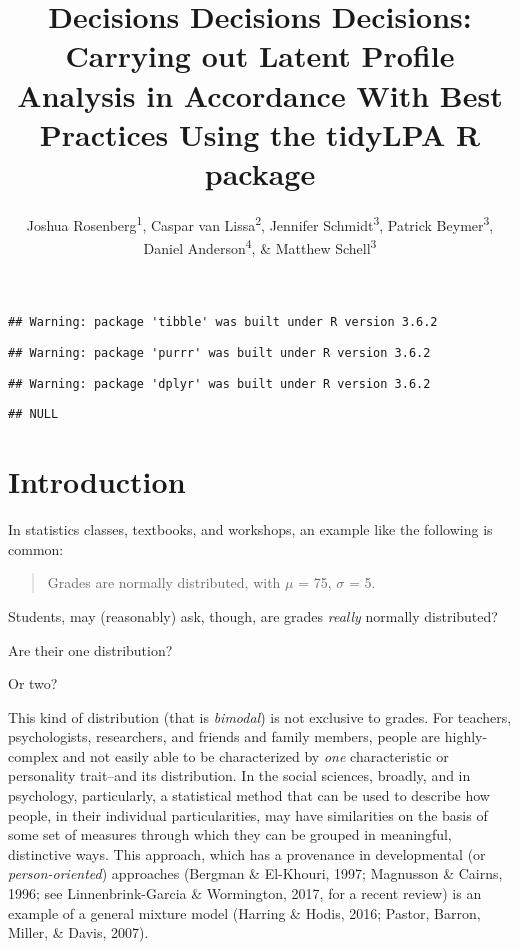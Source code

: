 \documentclass[man]{apa6}
\affiliation{
\vspace{0.5cm}
\textsuperscript{1} University of Tennessee, Knoxville\\\textsuperscript{2} Utrecht University\\\textsuperscript{3} Michigan State University\\\textsuperscript{4} University of Oregon\\\textsuperscript{5} }
\title{Decisions Decisions Decisions: Carrying out Latent Profile Analysis in Accordance With Best Practices Using the tidyLPA R package}
\author{Joshua Rosenberg\textsuperscript{1}, Caspar van Lissa\textsuperscript{2}, Jennifer Schmidt\textsuperscript{3}, Patrick Beymer\textsuperscript{3}, Daniel Anderson\textsuperscript{4}, \& Matthew Schell\textsuperscript{3}}
\date{}
\begin{document}
\maketitle

\begin{verbatim}
## Warning: package 'tibble' was built under R version 3.6.2
\end{verbatim}

\begin{verbatim}
## Warning: package 'purrr' was built under R version 3.6.2
\end{verbatim}

\begin{verbatim}
## Warning: package 'dplyr' was built under R version 3.6.2
\end{verbatim}

\begin{verbatim}
## NULL
\end{verbatim}

\hypertarget{introduction}{%
\section{Introduction}\label{introduction}}

In statistics classes, textbooks, and workshops, an example like the following is common:

\begin{quote}
Grades are normally distributed, with \(\mu\) = 75, \(\sigma\) = 5.
\end{quote}

Students, may (reasonably) ask, though, are grades \emph{really} normally distributed?

Are their one distribution?

Or two?

This kind of distribution (that is \emph{bimodal}) is not exclusive to grades. For
teachers, psychologists, researchers, and friends and family members, people are
highly-complex and not easily able to be characterized by \emph{one} characteristic
or personality trait--and its distribution. In the social sciences, broadly, and
in psychology, particularly, a statistical method that can be used to describe
how people, in their individual particularities, may have similarities on the
basis of some set of measures through which they can be grouped in meaningful,
distinctive ways. This approach, which has a provenance in developmental (or
\emph{person-oriented}) approaches (Bergman \& El-Khouri, 1997; Magnusson \&
Cairns, 1996; see Linnenbrink-Garcia \& Wormington, 2017, for a recent review) is
an example of a general mixture model (Harring \& Hodis, 2016; Pastor, Barron,
Miller, \& Davis, 2007).
\end{document}
